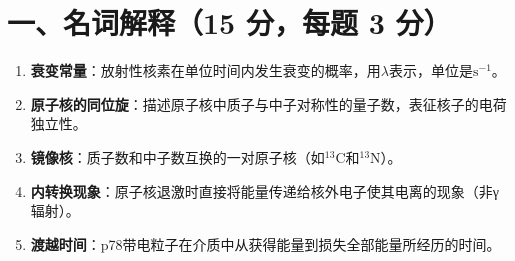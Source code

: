 \documentclass{article}
\begin{document}
\section*{一、名词解释（15 分，每题 3 分）}
\begin{enumerate}
    \item \textbf{衰变常量}：放射性核素在单位时间内发生衰变的概率，用$\lambda$表示，单位是$\mathrm{s^{-1}}$。
    
    \item \textbf{原子核的同位旋}：描述原子核中质子与中子对称性的量子数，表征核子的电荷独立性。
    
    \item \textbf{镜像核}：质子数和中子数互换的一对原子核（如$^{13}\mathrm{C}$和$^{13}\mathrm{N}$）。
    
    \item \textbf{内转换现象}：原子核退激时直接将能量传递给核外电子使其电离的现象（非γ辐射）。
    
    \item \textbf{渡越时间}：p78带电粒子在介质中从获得能量到损失全部能量所经历的时间。
\end{enumerate}
\end{document}
